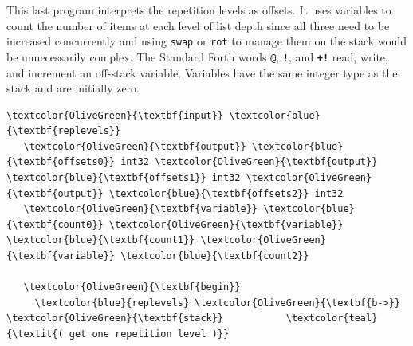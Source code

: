 \documentclass{webofc}
\begin{document}
\noindent This last program interprets the repetition levels as offsets. It uses variables to count the number of items at each level of list depth since all three need to be increased concurrently and using \texttt{swap} or \texttt{rot} to manage them on the stack would be unnecessarily complex. The Standard Forth words \texttt{@}, \texttt{!}, and \textcolor{OliveGreen}{\tt\textbf{+!}} read, write, and increment an off-stack variable. Variables have the same integer type as the stack and are initially zero.

\small
\begin{Verbatim}[commandchars=\\\{\}]
   \textcolor{OliveGreen}{\textbf{input}} \textcolor{blue}{\textbf{replevels}}
   \textcolor{OliveGreen}{\textbf{output}} \textcolor{blue}{\textbf{offsets0}} int32 \textcolor{OliveGreen}{\textbf{output}} \textcolor{blue}{\textbf{offsets1}} int32 \textcolor{OliveGreen}{\textbf{output}} \textcolor{blue}{\textbf{offsets2}} int32
   \textcolor{OliveGreen}{\textbf{variable}} \textcolor{blue}{\textbf{count0}} \textcolor{OliveGreen}{\textbf{variable}} \textcolor{blue}{\textbf{count1}} \textcolor{OliveGreen}{\textbf{variable}} \textcolor{blue}{\textbf{count2}}

   \textcolor{OliveGreen}{\textbf{begin}}
     \textcolor{blue}{replevels} \textcolor{OliveGreen}{\textbf{b->}} \textcolor{OliveGreen}{\textbf{stack}}           \textcolor{teal}{\textit{( get one repetition level )}}


\end{Verbatim}
\end{document}
